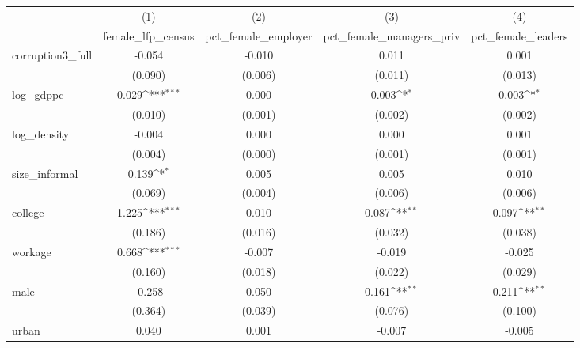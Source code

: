 {
\def\sym#1{\ifmmode^{#1}\else\(^{#1}\)\fi}
\begin{tabular}{l*{4}{c}}
\hline\hline
            &\multicolumn{1}{c}{(1)}&\multicolumn{1}{c}{(2)}&\multicolumn{1}{c}{(3)}&\multicolumn{1}{c}{(4)}\\
            &\multicolumn{1}{c}{female\_lfp\_census}&\multicolumn{1}{c}{pct\_female\_employer}&\multicolumn{1}{c}{pct\_female\_managers\_priv}&\multicolumn{1}{c}{pct\_female\_leaders}\\
\hline
corruption3\_full&      -0.054         &      -0.010         &       0.011         &       0.001         \\
            &     (0.090)         &     (0.006)         &     (0.011)         &     (0.013)         \\
[1em]
log\_gdppc   &       0.029\sym{***}&       0.000         &       0.003\sym{*}  &       0.003\sym{*}  \\
            &     (0.010)         &     (0.001)         &     (0.002)         &     (0.002)         \\
[1em]
log\_density &      -0.004         &       0.000         &       0.000         &       0.001         \\
            &     (0.004)         &     (0.000)         &     (0.001)         &     (0.001)         \\
[1em]
size\_informal&       0.139\sym{*}  &       0.005         &       0.005         &       0.010         \\
            &     (0.069)         &     (0.004)         &     (0.006)         &     (0.006)         \\
[1em]
college     &       1.225\sym{***}&       0.010         &       0.087\sym{**} &       0.097\sym{**} \\
            &     (0.186)         &     (0.016)         &     (0.032)         &     (0.038)         \\
[1em]
workage     &       0.668\sym{***}&      -0.007         &      -0.019         &      -0.025         \\
            &     (0.160)         &     (0.018)         &     (0.022)         &     (0.029)         \\
[1em]
male        &      -0.258         &       0.050         &       0.161\sym{**} &       0.211\sym{**} \\
            &     (0.364)         &     (0.039)         &     (0.076)         &     (0.100)         \\
[1em]
urban       &       0.040         &       0.001         &      -0.007         &      -0.005         \\

\end{tabular}}
